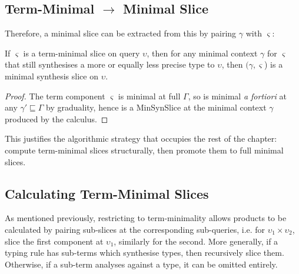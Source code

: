 \subsection{\yo Term-Minimal $\to$ Minimal Slice}
\label{sec:tmin-to-min}

Therefore, a minimal slice can be extracted from this by pairing $\gamma$ with $\varsigma$:

\begin{majortheorembox}
%
\begin{theorem}\label{thm:tmin-to-min}

If $\varsigma$ is a term-minimal slice on query $\upsilon$, then for any minimal context $\gamma$ for $\varsigma$ that still synthesises a more or equally less precise type to $\upsilon$, then $(\gamma, \varsigma$) is a minimal synthesis slice on $\upsilon$.
\end{theorem}
\end{majortheorembox}

\begin{proof}
The term component $\varsigma$ is minimal at full $\Gamma$, so is minimal \emph{a fortiori} at any $\gamma' \sqsubseteq \Gamma$ by graduality, hence is a MinSynSlice at the minimal context $\gamma$ produced by the calculus.
\end{proof}

This justifies the algorithmic strategy that occupies the rest of the chapter: compute term-minimal slices structurally, then promote them to full minimal slices.

\subsection{\yo Calculating Term-Minimal Slices}
\label{sec:term-minimal-calculus}

As mentioned previously, restricting to term-minimality allows products to be calculated by pairing sub-slices at the corresponding sub-queries, i.e. for $\upsilon_1 \times \upsilon_2$, slice the first component at $\upsilon_1$, similarly for the second. More generally, if a typing rule has sub-terms which synthesise types, then recursively slice them. Otherwise, if a sub-term analyses against a type, it can be omitted entirely.

